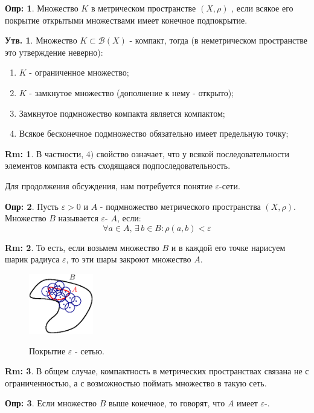 \documentclass[12pt]{article}
\newcommand{\MB}{\mathcal{B}}
\newcommand{\VE}{\varepsilon}
\theoremstyle{definition}
\newtheorem{defn}{Опр:}
\newtheorem{rem}{Rm:}
\newtheorem{prop}{Утв.}
\begin{document}
\begin{defn}
	Множество $K$ в метрическом пространстве $(X,\rho)$ , если всякое его покрытие открытыми множествами имеет конечное подпокрытие.
\end{defn}

\begin{prop}
	Множество $K \subset \MB(X)$ - компакт, тогда (в неметрическом пространстве это утверждение неверно):
	\begin{enumerate} [label ={\arabic*)}]
		\item $K$ - ограниченное множество;
		\item $K$ - замкнутое множество (дополнение к нему - открыто);
		\item Замкнутое подмножество компакта является компактом;
		\item Всякое бесконечное подмножество обязательно имеет предельную точку;
	\end{enumerate}
\end{prop}
\begin{rem}
	В частности, $4)$ свойство означает, что у всякой последовательности элементов компакта есть сходящаяся подпоследовательность.
\end{rem}
Для продолжения обсуждения, нам потребуется понятие $\VE$-сети.

\begin{defn}
	Пусть $\VE > 0$ и $A$ - подмножество метрического пространства $(X,\rho)$. Множество $B$ называется $\VE$- $A$, если:
	$$
		\forall a \in A, \, \exists \, b \in B \colon \rho(a,b) < \VE
	$$
\end{defn}
\begin{rem}
	То есть, если возьмем множество $B$ и в каждой его точке нарисуем шарик радиуса $\VE$, то эти шары закроют множество $A$.
	\begin{figure}[H]
		\centering
		\includegraphics[width=0.25\textwidth]{MA3L10_2.eps}
		\label{10_2}
		\caption{Покрытие $\VE$ - сетью.}
		\label{fig:Покрытие	}
	\end{figure}
\end{rem}
\begin{rem}
	В общем случае, компактность в метрических пространствах связана не с ограниченностью, а с возможностью поймать множество в такую сеть.
\end{rem}
\begin{defn}
	Если множество $B$ выше конечное, то говорят, что $A$ имеет  $\VE$-.	
\end{defn}
\end{document}
